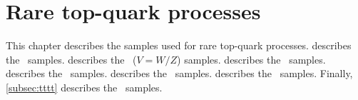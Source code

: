 \chapter{Rare top-quark processes}

This chapter describes the samples used for rare top-quark processes.
 describes the \ttH\ samples.
 describes the \ttV\ (\(V=W/Z\)) samples.
 describes the \ttgamma\ samples.
 describes the \tH\ samples.
 describes the \tZq\ samples.
 describes the \tWZ\ samples.
Finally, \cref{subsec:tttt} describes the \tttt\ samples.








%

